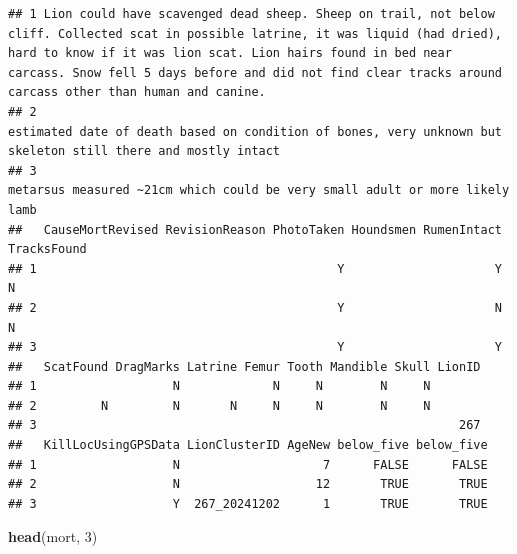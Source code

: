 \documentclass[
]{book}
\newenvironment{Shaded}{\begin{snugshade}}{\end{snugshade}}
\newcommand{\DecValTok}[1]{\textcolor[rgb]{0.00,0.00,0.81}{#1}}
\newcommand{\FunctionTok}[1]{\textcolor[rgb]{0.13,0.29,0.53}{\textbf{#1}}}
\newcommand{\NormalTok}[1]{#1}
\begin{document}
\begin{verbatim}
## 1 Lion could have scavenged dead sheep. Sheep on trail, not below cliff. Collected scat in possible latrine, it was liquid (had dried), hard to know if it was lion scat. Lion hairs found in bed near carcass. Snow fell 5 days before and did not find clear tracks around carcass other than human and canine.
## 2                                                                                                                                                                                                    estimated date of death based on condition of bones, very unknown but skeleton still there and mostly intact
## 3                                                                                                                                                                                                                                     metarsus measured ~21cm which could be very small adult or more likely lamb
##   CauseMortRevised RevisionReason PhotoTaken Houndsmen RumenIntact TracksFound
## 1                                          Y                     Y           N
## 2                                          Y                     N           N
## 3                                          Y                     Y            
##   ScatFound DragMarks Latrine Femur Tooth Mandible Skull LionID
## 1                   N             N     N        N     N       
## 2         N         N       N     N     N        N     N       
## 3                                                           267
##   KillLocUsingGPSData LionClusterID AgeNew below_five below_five
## 1                   N                    7      FALSE      FALSE
## 2                   N                   12       TRUE       TRUE
## 3                   Y  267_20241202      1       TRUE       TRUE
\end{verbatim}

\begin{Shaded}
\begin{Highlighting}[]
\FunctionTok{head}\NormalTok{(mort, }\DecValTok{3}\NormalTok{)}
\end{Highlighting}
\end{Shaded}
\end{document}
